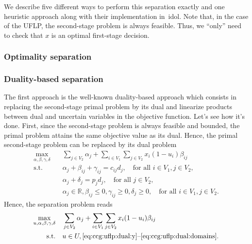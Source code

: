We describe five different ways to perform this separation exactly and one
heuristic approach along with their implementation in~\textsf{idol}. Note
that, in the case of the UFLP, the second-stage problem is always feasible.
Thus, we ``only'' need to check that $x$ is an optimal first-stage decision. 

\subsubsection{Optimality separation}

\subsubsection*{Duality-based separation}

The first approach is the well-known duality-based approach which consists in
replacing the second-stage primal problem by its dual and linearize products
between dual and uncertain variables in the objective function. Let's see how
it's done. First, since the second-stage problem is always feasible and
bounded, the primal problem attains the same objective value as its dual.
Hence, the primal second-stage problem can be replaced by its dual problem
% 
\begin{subequations}
    \begin{align}
        \max_{\alpha,\beta,\gamma,\delta} \quad & \sum_{ j\in V_2 } \alpha_j + \sum_{i\in V_1} \sum_{j\in V_2} x_i(1 - u_i) \beta_{ij} \\
        \text{s.t.} \quad & \alpha_j + \beta_{ij} + \gamma_{ij} = c_{ij}d_j, \quad \text{for all }i\in V_1, j\in V_2,
        \label{eq:ccg:uflp:dual:y} \\
        & \alpha_j + \delta_j = p_jd_j, \quad\text{for all } j\in V_2, \\
        & \alpha_j\in\mathbb{R}, \beta_{ij} \le 0, \gamma_{ij} \ge 0, \delta_j \ge 0, \quad \text{for all } i\in V_1, j\in V_2.
        \label{eq:ccg:uflp:dual:domains}
    \end{align}
\end{subequations}
Hence, the separation problem reads 
\begin{align*}
    \max_{u,\alpha,\beta,\gamma,\delta} \quad & \sum_{ j\in V_2 } \alpha_j + \sum_{i\in V_1} \sum_{j\in V_2} x_i(1 - u_i)\beta_{ij} \\
    \text{s.t.} \quad & u\in U, \text{\eqref{eq:ccg:uflp:dual:y}--\eqref{eq:ccg:uflp:dual:domains}}.
\end{align*}

